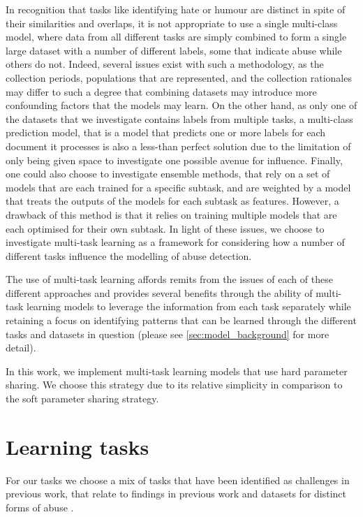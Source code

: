 In recognition that tasks like identifying hate or humour are distinct in spite of their similarities and overlaps, it is not appropriate to use a single multi-class model, where data from all different tasks are simply combined to form a single large dataset with a number of different labels, some that indicate abuse while others do not. Indeed, several issues exist with such a methodology, as the collection periods, populations that are represented, and the collection rationales may differ to such a degree that combining datasets may introduce more confounding factors that the models may learn. On the other hand, as only one of the datasets that we investigate contains labels from multiple tasks, a multi-class prediction model, that is a model that predicts one or more labels for each document it processes is also a less-than perfect solution due to the limitation of only being given space to investigate one possible avenue for influence. Finally, one could also choose to investigate ensemble methods, that rely on a set of models that are each trained for a specific subtask, and are weighted by a model that treats the outputs of the models for each subtask as features. However, a drawback of this method is that it relies on training multiple models that are each optimised for their own subtask. In light of these issues, we choose to investigate multi-task learning as a framework for considering how a number of different tasks influence the modelling of abuse detection.


The use of multi-task learning affords remits from the issues of each of these different approaches and provides several benefits through the ability of multi-task learning models to leverage the information from each task separately while retaining a focus on identifying patterns that can be learned through the different tasks and datasets in question (please see \autoref{sec:model_background} for more detail).

In this work, we implement multi-task learning models that use hard parameter sharing. We choose this strategy due to its relative simplicity in comparison to the soft parameter sharing strategy.

\section{Learning tasks}

For our tasks we choose a mix of tasks that have been identified as challenges in previous work, that relate to findings in previous work \cite{Waseem-Hovy:2016,Davidson:2017,Schmidt:2017} and datasets for distinct forms of abuse \cite{Waseem:2016,Waseem-Hovy:2016,Davidson:2017,Wulczyn:2017}.

